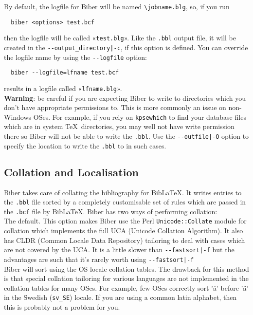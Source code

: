 \documentclass{ltxdockit}
\def\biberex#1{\hbox{\hspace{-4em}\texttt{\small \detokenize{#1}}}}
\begin{document}
By default, the logfile for Biber will be named \verb+\jobname.blg+,
so, if you run

\begin{verbatim}
  biber <options> test.bcf
\end{verbatim}

\noindent then the logfile will be called «\verb+test.blg+». Like the
\verb+.bbl+ output file, it will be created in the
\verb+--output_directory|-c+, if this option is defined. You can
override the logfile name by using the \verb+--logfile+ option:

\begin{verbatim}
  biber --logfile=lfname test.bcf
\end{verbatim}

\noindent results in a logfile called «\verb+lfname.blg+».\\

\noindent \textbf{Warning}: be careful if you are expecting Biber to
write to directories which you don't have appropriate permissions to. This
is more commonly an issue on non-Windows OSes. For example, if you rely on
\verb+kpsewhich+ to find your database files which are in system \TeX\
directories, you may well not have write permission there so Biber
will not be able to write the \verb+.bbl+. Use the \verb+--outfile|-O+
option to specify the location to write the \verb+.bbl+ to in such cases.

\subsection{Collation and Localisation}\label{coll}

Biber takes care of collating the bibliography for
Bib\LaTeX. It writes entries to the \verb+.bbl+ file sorted by a
completely customisable set of rules which are passed in the
\verb+.bcf+ file by Bib\LaTeX. Biber has two ways of performing
collation:\\[2ex]

\biberex{--collate|-C}
  \noindent The default. This option makes Biber use the Perl
  \verb+Unicode::Collate+ module for collation which implements the full UCA (Unicode
  Collation Algorithm). It also has CLDR (Common Locale Data
  Repository) tailoring to deal with cases which are not covered by the
  UCA. It is a little slower than \verb+--fastsort|-f+ but the
  advantages are such that it's rarely worth using \verb+--fastsort|-f+\\[1ex]

\biberex{--fastsort|-f}
  \noindent Biber will sort using
  the OS locale collation tables. The drawback for this method is that special
  collation tailoring for various languages are not implemented in the
  collation tables for many OSes. For example, few OSes correctly sort 'å'
  before 'ä' in the Swedish (\verb+sv_SE+) locale. If you are using a
  common latin alphabet, then this is probably not a problem for you.\\[2ex]
\end{document}
